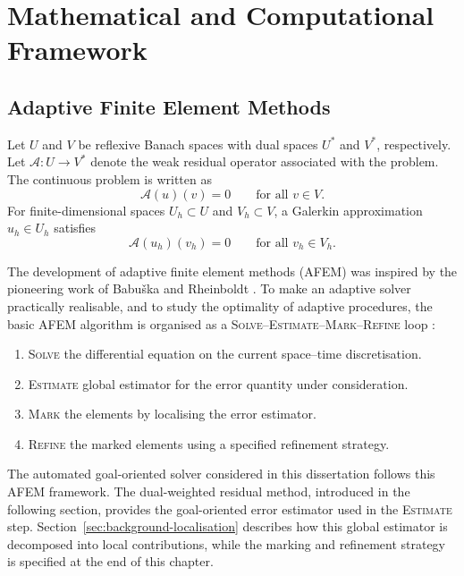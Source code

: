 \chapter{Mathematical and Computational Framework}
\label{chap:background}


\section{Adaptive Finite Element Methods}
\label{sec:background-afem}

Let \(U\) and \(V\) be reflexive Banach spaces with dual spaces \(U^\ast\) and \(V^\ast\), respectively. Let \(\mathcal{A}:U\rightarrow V^\ast\) denote the weak residual operator associated with the problem. The continuous problem is written as
\begin{equation}
  \mathcal{A}(u)(v)=0
  \qquad\text{for all }v\in V.
  \label{eq:abstract-primal}
\end{equation}
For finite-dimensional spaces \(U_h\subset U\) and \(V_h\subset V\), a Galerkin approximation \(u_h\in U_h\) satisfies
\begin{equation}
  \mathcal{A}(u_h)(v_h)=0
  \qquad\text{for all }v_h\in V_h.
  \label{eq:abstract-discrete-primal}
\end{equation}

The development of adaptive finite element methods (AFEM) was inspired by the pioneering work of Babu\v{s}ka and Rheinboldt \cite{pioneer}. To make an adaptive solver practically realisable, and to study the optimality of adaptive procedures, the basic AFEM algorithm is organised as a \textsc{Solve--Estimate--Mark--Refine} loop \cite{ENDTMAYER202419}:
\begin{enumerate}
  \item \textsc{Solve} the differential equation on the current space--time discretisation.
  \item \textsc{Estimate} global estimator for the error quantity under consideration.
  \item \textsc{Mark} the elements by localising the error estimator.
  \item \textsc{Refine} the marked elements using a specified refinement strategy.
\end{enumerate}

The automated goal-oriented solver considered in this dissertation follows this AFEM framework. The dual-weighted residual method, introduced in the following section, provides the goal-oriented error estimator used in the \textsc{Estimate} step. Section~\ref{sec:background-localisation} describes how this global estimator is decomposed into local contributions, while the marking and refinement strategy is specified at the end of this chapter.



